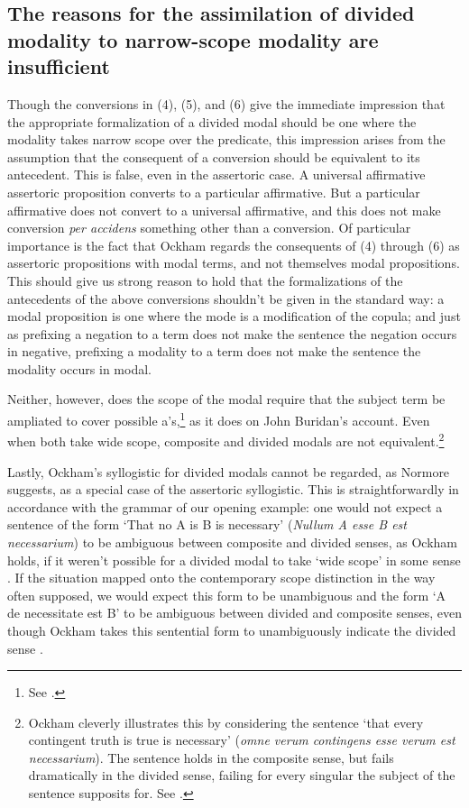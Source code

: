 \documentclass[a4paper]{article}
\begin{document}
\subsection{The reasons for the assimilation of divided modality to narrow-scope modality are insufficient}
Though the conversions in (4), (5), and (6) give the immediate impression that the appropriate formalization of a divided modal should be one where the modality takes narrow scope over the predicate, this impression arises from the assumption that the consequent of a conversion should be equivalent to its antecedent. This is false, even in the assertoric case. A universal affirmative assertoric proposition converts to a particular affirmative. But a particular affirmative does not convert to a universal affirmative, and this does not make conversion \textit{per accidens} something other than a conversion. Of particular importance is the fact that Ockham regards the consequents of (4) through (6) as assertoric propositions with modal terms, and not themselves modal propositions.  This should give us strong reason to hold that the formalizations of the antecedents of the above conversions shouldn't be given in the standard way: a modal proposition is one where the mode is a modification of the copula; and just as prefixing a negation to a term does not make the sentence the negation occurs in negative, prefixing a modality to a term does not make the sentence the modality occurs in modal.

Neither, however, does the scope of the modal require that the subject term be ampliated to cover possible a's,\footnote{See \cite{PriestRead1981}.}  as it does on John Buridan's account. Even when both take wide scope, composite and divided modals are not equivalent.\footnote{Ockham cleverly illustrates this by considering the sentence `that every contingent truth is true is necessary' (\textit{omne verum contingens esse verum est necessarium}). The sentence holds in the composite sense, but fails dramatically in the divided sense, failing for every singular the subject of the sentence supposits for. See \cite[II. 9, p. 246]{OckhamSL2}.}

Lastly, Ockham's syllogistic for divided modals cannot be regarded, as Normore suggests, as a special case of the assertoric syllogistic. This is straightforwardly in accordance with the grammar of our opening example: one would not expect a sentence of the form `That no A is B is necessary' (\textit{Nullum A esse B est necessarium}) to be ambiguous between composite and divided senses, as Ockham holds, if it weren't possible for a divided modal to take `wide scope' in some sense \cite[II. 9, p. 246]{OckhamSL2}. If the situation mapped onto the contemporary scope distinction in the way often supposed, we would expect this form to be unambiguous and the form `A de necessitate est B' to be ambiguous between divided and composite senses, even though Ockham takes this sentential form to unambiguously indicate the divided sense \cite[ibid.]{OckhamSL2}.
\end{document}
